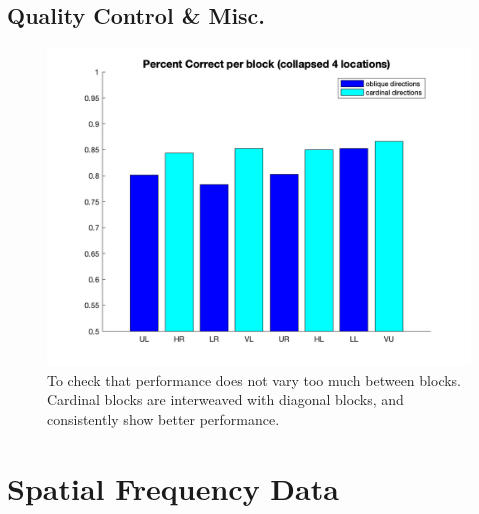 \documentclass[11pt]{article} %
\begin{document}
\subsection{Quality Control \& Misc.}
\begin{figure}[H]
\centering %
\includegraphics[scale=.25]{Images/block_performance.png}
\caption{To check that performance does not vary too much between blocks. Cardinal blocks are interweaved with diagonal blocks, and consistently show better performance.}
\end{figure}

\newpage
\section{Spatial Frequency Data}
\end{document}
